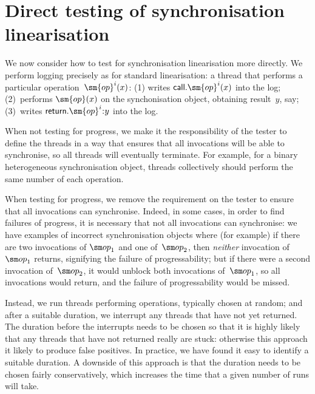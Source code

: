 \section{Direct testing of synchronisation linearisation}
\label{sec:direct}

We now consider how to test for synchronisation linearisation more directly.
We perform logging precisely as for standard linearisation: a thread that
performs a particular operation~$\sm{op}^i(x)$: (1) writes
$\call.\sm{op}^i(x)$ into the log; (2)~performs $\sm{op}(x)$ on the
synchonisation object, obtaining result~$y$, say; (3)~writes
$\return.\sm{op}^i \:: y$ into the log.  

When not testing for progress, we make it the responsibility of the tester to
define the threads in a way that ensures that all invocations will be able to
synchronise, so all threads will eventually terminate.  For example, for a
binary heterogeneous synchronisation object, threads collectively should
perform the same number of each operation. 

When testing for progress, we remove the requirement on the tester to ensure
that all invocations can synchronise.  Indeed, in some cases, in order to find
failures of progress, it is necessary that not all invocations can
synchronise: we have examples of incorrect synchronisation objects where (for
example) if there are two invocations of $\op_1$ and one of~$\op_2$, then
\emph{neither} invocation of~$\op_1$ returns, signifying the failure of
progressability; but if there were a second invocation of~$\op_2$, it would
unblock both invocations of~$\op_1$, so all invocations would return, and the
failure of progressability would be missed.

Instead, we run threads performing operations, typically chosen at random; and
after a suitable duration, we interrupt any threads that have not yet
returned.  The duration before the interrupts needs to be chosen so that it is
highly likely that any threads that have not returned really are stuck:
otherwise this approach it likely to produce false positives.  In practice, we
have found it easy to identify a suitable duration.  A downside of this
approach is that the duration needs to be chosen fairly conservatively, which
increases the time that a given number of runs will take.


